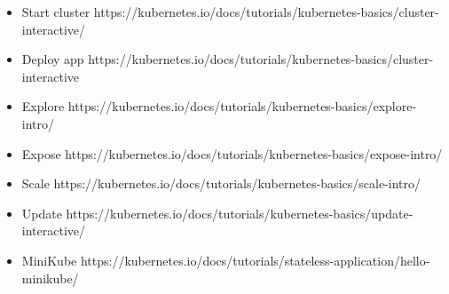 \begin{itemize}

\item
  Start cluster
  https://kubernetes.io/docs/tutorials/kubernetes-basics/cluster-interactive/
\item
  Deploy app
  https://kubernetes.io/docs/tutorials/kubernetes-basics/cluster-interactive
\item
  Explore
  https://kubernetes.io/docs/tutorials/kubernetes-basics/explore-intro/
\item
  Expose
  https://kubernetes.io/docs/tutorials/kubernetes-basics/expose-intro/
\item
  Scale
  https://kubernetes.io/docs/tutorials/kubernetes-basics/scale-intro/
\item
  Update
  https://kubernetes.io/docs/tutorials/kubernetes-basics/update-interactive/
\item
  MiniKube
  https://kubernetes.io/docs/tutorials/stateless-application/hello-minikube/
\end{itemize}
